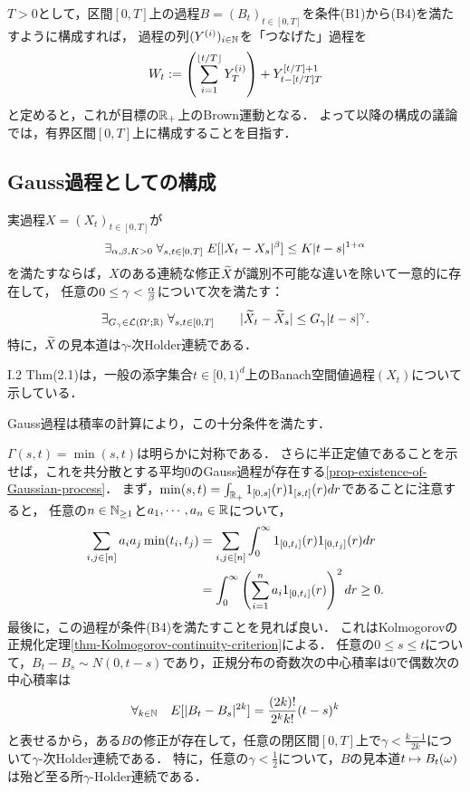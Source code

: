 \documentclass[uplatex,dvipdfmx]{jsreport}
\begin{document}
\begin{shishin}
    $T>0$として，区間$[0,T]$上の過程$B=(B_t)_{t\in[0,T]}$を条件(B1)から(B4)を満たすように構成すれば，
    過程の列$(Y^{(i)})_{i\in\mathbb{N}}$を「つなげた」過程を
    \[W_t:=\left(\sum^{\lfloor t/T\rfloor}_{i=1}Y_T^{(i)}\right)+Y^{[t/T]+1}_{t-[t/T]T}\]
    と定めると，これが目標の$\mathbb{R}_+$上のBrown運動となる．
    よって以降の構成の議論では，有界区間$[0,T]$上に構成することを目指す．
\end{shishin}

\subsection{Gauss過程としての構成}

\begin{theorem}\label{thm-Kolmogorov-continuity-criterion}
    実過程$X=(X_t)_{t\in[0,T]}$が
    \[\exists_{\alpha,\beta,K>0}\;\forall_{s,t\in[0,T]}\;E[\lvert X_{t}-X_s\rvert^\beta]\le K\lvert t-s\rvert^{1+\alpha}\]
    を満たすならば，$X$のある連続な修正$\widetilde{X}$が識別不可能な違いを除いて一意的に存在して，
    任意の$0\le\gamma<\frac{\alpha}{\beta}$について次を満たす：
    \[\exists_{G_\gamma\in\mathcal{L}(\Omega';\mathbb{R})}\;\forall_{s,t\in[0,T]}\qquad\lvert\widetilde{X}_t-\widetilde{X}_s\rvert\le G_\gamma\lvert t-s\rvert^\gamma.\]
    特に，$\widetilde{X}$の見本道は$\gamma$-次Holder連続である．
\end{theorem}
\begin{Proof}
    \cite{Revus and Yor}I.2 Thm(2.1)は，一般の添字集合$t\in[0,1)^d$上のBanach空間値過程$(X_t)$について示している．
\end{Proof}
\begin{remarks}
    Gauss過程は積率の計算により，この十分条件を満たす．
\end{remarks}

\begin{construction}\label{construction-Kolmogorov}
    $\Gamma(s,t)=\min(s,t)$は明らかに対称である．
    さらに半正定値であることを示せば，これを共分散とする平均$0$のGauss過程が存在する\ref{prop-existence-of-Gaussian-process}．
    まず，$\min(s,t)=\int_{\mathbb{R}_+}1_{[0,s]}(r)1_{[s,t]}(r)dr$であることに注意すると，
    任意の$n\in\mathbb{N}_{\ge1}$と$a_1,\cdots,a_n\in\mathbb{R}$について，
    \begin{align*}
        \sum_{i,j\in[n]}a_ia_j\min(t_i,t_j)&=\sum_{i,j\in[n]}\int^\infty_01_{[0,t_i]}(r)1_{[0,t_j]}(r)dr\\
        &=\int^\infty_0\left(\sum_{i=1}^na_i1_{[0,t_i]}(r)\right)^2dr\ge0.
    \end{align*}
    最後に，この過程が条件(B4)を満たすことを見れば良い．
    これはKolmogorovの正規化定理\ref{thm-Kolmogorov-continuity-criterion}による．
    任意の$0\le s\le  t$について，$B_t-B_s\sim N(0,t-s)$であり，正規分布の奇数次の中心積率は$0$で偶数次の中心積率は
    \[\forall_{k\in\mathbb{N}}\quad E[\lvert B_t-B_s\rvert^{2k}]=\frac{(2k)!}{2^kk!}(t-s)^k\]
    と表せるから，ある$B$の修正が存在して，任意の閉区間$[0,T]$上で$\gamma<\frac{k-1}{2k}$について$\gamma$-次Holder連続である．
    特に，任意の$\gamma<\frac{1}{2}$について，$B$の見本道$t\mapsto B_t(\omega)$は殆ど至る所$\gamma$-Holder連続である．
\end{construction}
\end{document}
